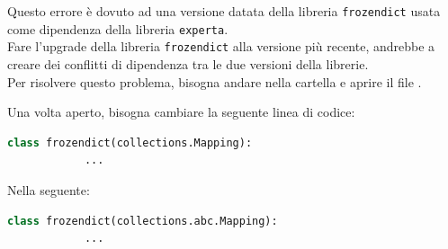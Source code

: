 \documentclass[12pt, letterpaper]{article}
\begin{document}
\noindent Questo errore è dovuto ad una versione datata della libreria \texttt{frozendict}
usata come dipendenza della libreria \texttt{experta}. \\

\noindent Fare l'upgrade della libreria \texttt{frozendict} alla versione più recente, andrebbe a
creare dei conflitti di dipendenza tra le due versioni della librerie. \\

\noindent Per risolvere questo problema, bisogna andare nella cartella
 e aprire il file .

\noindent Una volta aperto, bisogna cambiare la seguente linea di codice: \\

\begin{lstlisting}[language=Python]
      class frozendict(collections.Mapping):
            ...
\end{lstlisting}

Nella seguente:

\begin{lstlisting}[language=Python]
      class frozendict(collections.abc.Mapping):
            ...
\end{lstlisting}


\end{document}
